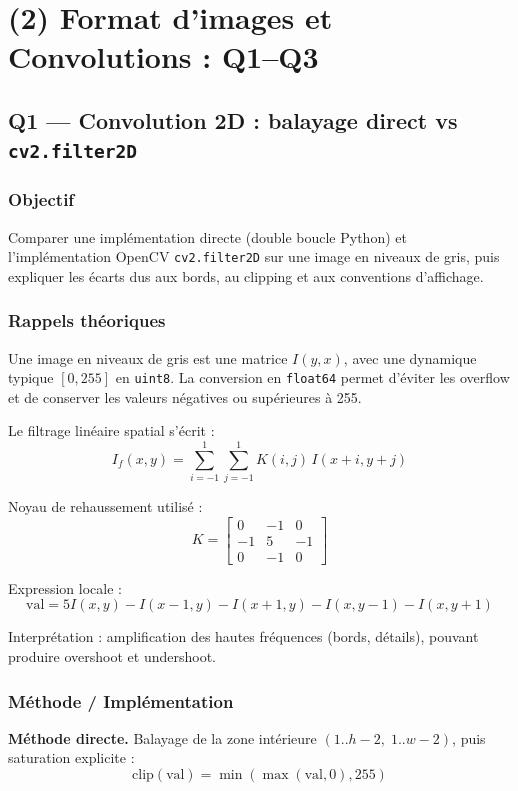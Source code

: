 \documentclass[11pt,a4paper]{article}
\begin{document}
\section{(2) Format d'images et Convolutions : Q1--Q3}

\subsection{Q1 --- Convolution 2D : balayage direct vs \texttt{cv2.filter2D}}

\subsubsection{Objectif}
Comparer une implémentation directe (double boucle Python) et l'implémentation OpenCV \texttt{cv2.filter2D} sur une image en niveaux de gris, puis expliquer les écarts dus aux bords, au clipping et aux conventions d'affichage.

\subsubsection{Rappels théoriques}
Une image en niveaux de gris est une matrice \(I(y,x)\), avec une dynamique typique \([0,255]\) en \texttt{uint8}. La conversion en \texttt{float64} permet d'éviter les overflow et de conserver les valeurs négatives ou supérieures à 255.

Le filtrage linéaire spatial s'écrit :
\[
I_f(x,y)=\sum_{i=-1}^{1}\sum_{j=-1}^{1}K(i,j)\,I(x+i,y+j)
\]

Noyau de rehaussement utilisé :
\[
K=\begin{bmatrix}
0 & -1 & 0 \\
-1 & 5 & -1 \\
0 & -1 & 0
\end{bmatrix}
\]

Expression locale :
\[
\text{val}=5I(x,y)-I(x-1,y)-I(x+1,y)-I(x,y-1)-I(x,y+1)
\]

Interprétation : amplification des hautes fréquences (bords, détails), pouvant produire overshoot et undershoot.

\subsubsection{Méthode / Implémentation}
\textbf{Méthode directe.} Balayage de la zone intérieure \((1..h-2,\;1..w-2)\), puis saturation explicite :
\[
\mathrm{clip}(\text{val})=\min(\max(\text{val},0),255)
\]
\end{document}
